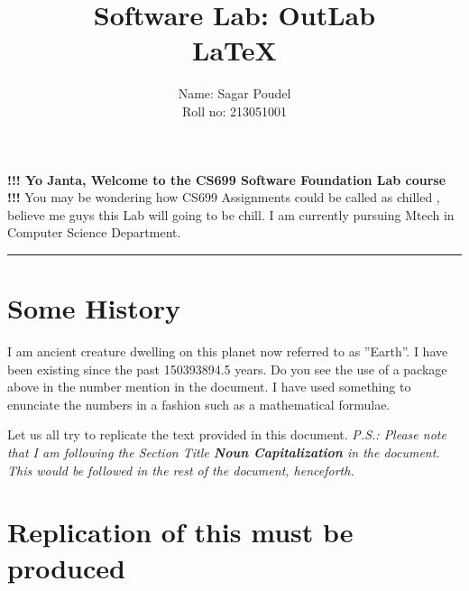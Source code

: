 \documentclass[12pt]{article}
\title{ \textbf {Software Lab: OutLab\\ \LaTeX{}}}
\author {
    Name: Sagar Poudel\\
    Roll no: 213051001
}
\begin{document}
\begin{titlingpage}
    \maketitle
\end{titlingpage}
{
\hypersetup{linkcolor=black}
\tableofcontents
}
\newpage
\begin{flushleft}
    \textbf{!!! Yo Janta, Welcome to the CS699 Software Foundation Lab course !!!}\newline
    You may be wondering how CS699 Assignments could be called as chilled , believe me guys this Lab will going to be chill. I am currently pursuing Mtech in Computer Science Department.
\end{flushleft}
\vspace{3pt}
\hrule
\section{Some History}

I am ancient creature dwelling on this planet now referred to as ”Earth”. I have been
existing since the past 150393894.5 years. Do you see the use of a package above in the
number mention in the document. I have used something to enunciate the numbers in
a fashion such as a mathematical formulae.

Let us all try to replicate the text provided in this document.\newline
\indent \emph{P.S.: Please note that I am following the Section Title \textbf{Noun Capitalization} in
    the document. This would be followed in the rest of the document, henceforth.}


\section{Replication of this must be produced}
\end{document}
